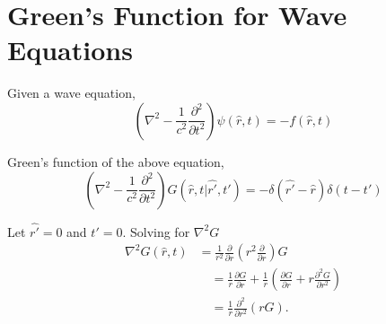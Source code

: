


\chapter{Green's Function for Wave Equations} \label{app:GF}
Given a wave equation,
\begin{equation*}
    \left(\nabla^2 - \frac{1}{c^2}\frac{\partial^2}{\partial t^2} \right) \psi(\hat{r},t)=-f(\hat{r},t)
\end{equation*}

Green's function of the above equation,
\begin{equation*}
    \left(\nabla^2 - \frac{1}{c^2}\frac{\partial^2}{\partial t^2} \right) G(\hat{r},t |\hat{r'},t')=-\delta(\hat{r'}-\hat{r})\delta(t-t')
\end{equation*}

Let $\hat{r'}=0$ and $t'=0$. Solving for $\nabla^2G$
\begin{equation*}
    \begin{split}
        \nabla^2G(\hat{r},t) &= \frac{1}{r^2}\frac{\partial}{\partial r} \left(r^2 \frac{\partial}{\partial r} \right)G \\
        &\quad =\frac{1}{r} \frac{\partial G}{\partial r} + \frac{1}{r} \left( \frac{\partial G}{\partial r} + r \frac{\partial^2G}{\partial r^2} \right) \\
        &\quad = \frac{1}{r} \frac{\partial^2}{\partial r^2} (rG).
    \end{split}
\end{equation*}

